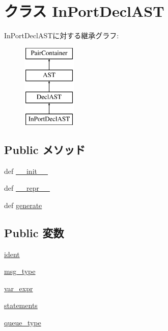 \hypertarget{classslicc_1_1ast_1_1InPortDeclAST_1_1InPortDeclAST}{
\section{クラス InPortDeclAST}
\label{classslicc_1_1ast_1_1InPortDeclAST_1_1InPortDeclAST}
}
InPortDeclASTに対する継承グラフ:\begin{figure}[H]
\begin{center}
\leavevmode
\includegraphics[height=4cm]{classslicc_1_1ast_1_1InPortDeclAST_1_1InPortDeclAST}
\end{center}
\end{figure}
\subsection*{Public メソッド}
\begin{DoxyCompactItemize}
\item 
def \hyperlink{classslicc_1_1ast_1_1InPortDeclAST_1_1InPortDeclAST_ac775ee34451fdfa742b318538164070e}{\_\-\_\-init\_\-\_\-}
\item 
def \hyperlink{classslicc_1_1ast_1_1InPortDeclAST_1_1InPortDeclAST_ad8b9328939df072e4740cd9a63189744}{\_\-\_\-repr\_\-\_\-}
\item 
def \hyperlink{classslicc_1_1ast_1_1InPortDeclAST_1_1InPortDeclAST_a4555d1cee0dccf3942ea35fe86de2e8e}{generate}
\end{DoxyCompactItemize}
\subsection*{Public 変数}
\begin{DoxyCompactItemize}
\item 
\hyperlink{classslicc_1_1ast_1_1InPortDeclAST_1_1InPortDeclAST_a2fe57e2d3d2cba9a3aeba2f629eaa78b}{ident}
\item 
\hyperlink{classslicc_1_1ast_1_1InPortDeclAST_1_1InPortDeclAST_a35822c953540e9ad193309b6d4f65011}{msg\_\-type}
\item 
\hyperlink{classslicc_1_1ast_1_1InPortDeclAST_1_1InPortDeclAST_a97ca97f39ab34737252626affb340d07}{var\_\-expr}
\item 
\hyperlink{classslicc_1_1ast_1_1InPortDeclAST_1_1InPortDeclAST_aa25d5649a404c698dcacaa271a285c92}{statements}
\item 
\hyperlink{classslicc_1_1ast_1_1InPortDeclAST_1_1InPortDeclAST_a383182bcdfb28437c9797ab5b6559038}{queue\_\-type}
\end{DoxyCompactItemize}



